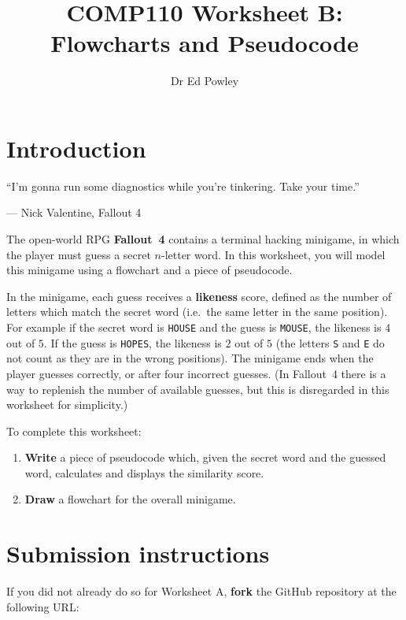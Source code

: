 \documentclass{../../../fal_assignment}
\title{COMP110 Worksheet B: Flowcharts and Pseudocode}
\author{Dr Ed Powley}
\begin{document}
\maketitle

\section*{Introduction}

\begin{marginquote}
``I'm gonna run some diagnostics while you're tinkering. Take your time.''

--- Nick Valentine, Fallout 4
\end{marginquote}

The open-world RPG \textbf{Fallout~4} contains a terminal hacking minigame, in which
the player must guess a secret $n$-letter word.
In this worksheet, you will model this minigame using a flowchart and a piece of pseudocode.

In the minigame, each guess receives a \textbf{likeness} score,
defined as the number of letters which match the secret word (i.e.\ the same letter in the same position).
For example if the secret word is \texttt{HOUSE} and the guess is \texttt{MOUSE}, the likeness is $4$ out of $5$.
If the guess is \texttt{HOPES}, the likeness is $2$ out of $5$
(the letters \texttt{S} and \texttt{E} do not count as they are in the wrong positions).
The minigame ends when the player guesses correctly, or after four incorrect guesses.
(In Fallout~4 there is a way to replenish the number of available guesses,
but this is disregarded in this worksheet for simplicity.)

To complete this worksheet:
\begin{enumerate}[label=(\alph*)]
	\item \textbf{Write} a piece of pseudocode which, given the secret word and the guessed word,
		calculates and displays the similarity score.
	\item \textbf{Draw} a flowchart for the overall minigame.
\end{enumerate}

\section*{Submission instructions}

If you did not already do so for Worksheet A, \textbf{fork} the GitHub repository at the following URL:
\end{document}
